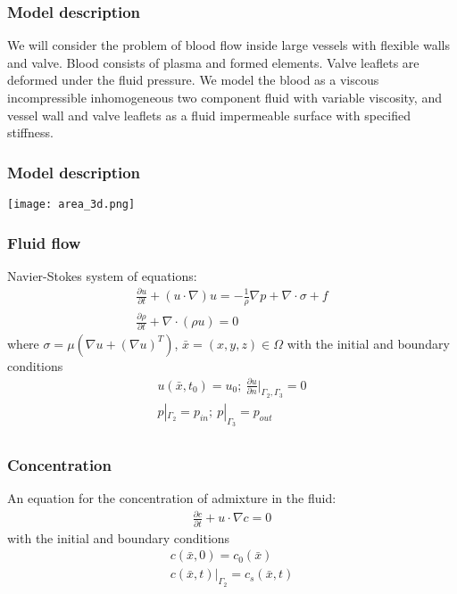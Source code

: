 \documentclass[14pt]{beamer}
\begin{document}
\begin{frame}
\frametitle{Model description}
We will consider the problem of blood flow inside large vessels with flexible walls and valve.
Blood consists of plasma and formed elements. Valve leaflets are deformed under the fluid pressure.
We model the blood as a viscous incompressible inhomogeneous two component fluid with variable viscosity,
and vessel wall and valve leaflets as a fluid impermeable surface with specified stiffness.
\end{frame}

\begin{frame}
\frametitle{Model description}
    \begin{center}
        \texttt{[image: area\_3d.png]}
    \end{center}
\end{frame}

\begin{frame}
\frametitle{Fluid flow}
Navier-Stokes system of equations:
\begin{gather}
    \label{eq:motion}
    \frac{\partial u}{\partial t} + (u \cdot \nabla) u = - \frac{1}{\rho} \nabla p + \nabla \cdot \sigma + f\\
    \label{eq:continuity}
    \frac{\partial \rho}{\partial t} + \nabla \cdot (\rho u) = 0 
\end{gather}
where $\sigma = \mu (\nabla u + (\nabla u)^{T})$, $\bar{x} = (x, y, z) \in \Omega$ with the initial and boundary conditions
\begin{gather*}
    u(\bar{x}, t_0) = u_0;\ \frac{\partial u}{\partial n}|_{\Gamma_2, \Gamma_3} = 0\\
    p|_{\Gamma_2} = p_{in};\ p|_{\Gamma_3} = p_{out} \\
\end{gather*}

\end{frame}

\begin{frame}
\frametitle{Concentration}
An equation for the concentration of admixture in the fluid:
\begin{gather}
    \label{eq:concentration}
    \frac{\partial c}{\partial t} + u \cdot \nabla c = 0
\end{gather}
with the initial and boundary conditions
\begin{gather*}
    c(\bar{x}, 0) = c_0(\bar{x})\\
    c(\bar{x}, t)|_{\Gamma_2} = c_s(\bar{x}, t)
\end{gather*}

\end{frame}
\end{document}
